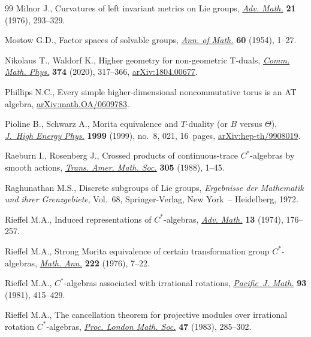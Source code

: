 \documentclass[10pt,a4paper]{amsart}
\numberwithin{equation}{section}
\begin{document}
\begin{thebibliography}{99}
Milnor J., Curvatures of left invariant metrics on {L}ie groups, \href{https://doi.org/10.1016/S0001-8708(76)80002-3}{\textit{Adv.
 Math.}} \textbf{21} (1976), 293--329.

Mostow G.D., Factor spaces of solvable groups, \href{https://doi.org/10.2307/1969700}{\textit{Ann. of Math.}}
 \textbf{60} (1954), 1--27.

Nikolaus T., Waldorf K., Higher geometry for non-geometric {T}-duals,
 \href{https://doi.org/10.1007/s00220-019-03496-3}{\textit{Comm. Math. Phys.}} \textbf{374} (2020), 317--366,
 \href{https://arxiv.org/abs/1804.00677}{arXiv:1804.00677}.

Phillips N.C., Every simple higher-dimensional noncommutative torus is an AT
 algebra, \href{https://arxiv.org/abs/math.OA/0609783}{arXiv:math.OA/0609783}.

Pioline B., Schwarz A., Morita equivalence and {$T$}-duality (or {$B$} versus
 {$\Theta$}), \href{https://doi.org/10.1088/1126-6708/1999/08/021}{\textit{J.~High Energy Phys.}} \textbf{1999} (1999), no.~8, 021,
 16~pages, \href{https://arxiv.org/abs/hep-th/9908019}{arXiv:hep-th/9908019}.

Raeburn I., Rosenberg J., Crossed products of continuous-trace
 {$C^\ast$}-algebras by smooth actions, \href{https://doi.org/10.2307/2001039}{\textit{Trans. Amer. Math. Soc.}}
 \textbf{305} (1988), 1--45.

Raghunathan M.S., Discrete subgroups of {L}ie groups, \textit{Ergebnisse der
 Mathematik und ihrer Grenzgebiete}, Vol.~68, Springer-Verlag, New York~--
 Heidelberg, 1972.

Rieffel M.A., Induced representations of {$C^{\ast}$}-algebras, \href{https://doi.org/10.1016/0001-8708(74)90068-1}{\textit{Adv.
 Math.}} \textbf{13} (1974), 176--257.

Rieffel M.A., Strong {M}orita equivalence of certain transformation group
 {$C^*$}-algebras, \href{https://doi.org/10.1007/BF01418238}{\textit{Math. Ann.}} \textbf{222} (1976), 7--22.

Rieffel M.A., {$C^{\ast} $}-algebras associated with irrational rotations,
 \href{https://doi.org/10.2140/pjm.1981.93.415}{\textit{Pacific~J. Math.}} \textbf{93} (1981), 415--429.

Rieffel M.A., The cancellation theorem for projective modules over irrational
 rotation {$C^{\ast} $}-algebras, \href{https://doi.org/10.1112/plms/s3-47.2.285}{\textit{Proc. London Math. Soc.}} \textbf{47}
 (1983), 285--302.


\end{thebibliography}
\end{document}

